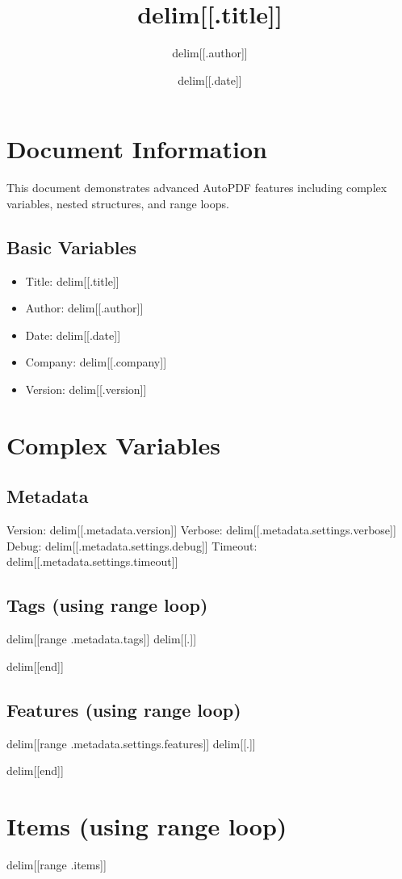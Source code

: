 \documentclass{article}
\title{delim[[.title]]}
\author{delim[[.author]]}
\date{delim[[.date]]}
\begin{document}
\maketitle

\section{Document Information}
This document demonstrates advanced AutoPDF features including complex variables, nested structures, and range loops.

\subsection{Basic Variables}
\begin{itemize}
\item Title: delim[[.title]]
\item Author: delim[[.author]]
\item Date: delim[[.date]]
\item Company: delim[[.company]]
\item Version: delim[[.version]]
\end{itemize}

\section{Complex Variables}
\subsection{Metadata}
Version: delim[[.metadata.version]]
Verbose: delim[[.metadata.settings.verbose]]
Debug: delim[[.metadata.settings.debug]]
Timeout: delim[[.metadata.settings.timeout]]

\subsection{Tags (using range loop)}
delim[[range .metadata.tags]]
delim[[.]]\par
delim[[end]]

\subsection{Features (using range loop)}
delim[[range .metadata.settings.features]]
delim[[.]]\par
delim[[end]]

\section{Items (using range loop)}
delim[[range .items]]
\end{document}
